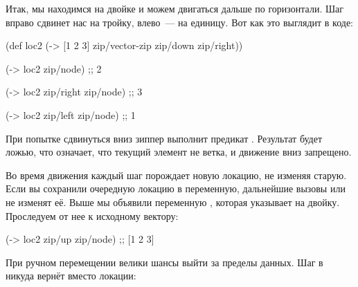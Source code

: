 
Итак, мы находимся на двойке и можем двигаться дальше по горизонтали. Шаг вправо
сдвинет нас на тройку, влево~--- на единицу. Вот как это выглядит в коде:

\begin{english}
  \begin{clojure}
(def loc2
  (-> [1 2 3]
      zip/vector-zip
      zip/down
      zip/right))

(-> loc2 zip/node)
;; 2

(-> loc2 zip/right zip/node)
;; 3

(-> loc2 zip/left zip/node)
;; 1
  \end{clojure}
\end{english}

При попытке сдвинуться вниз зиппер выполнит предикат . Результат
будет ложью, что означает, что текущий элемент не ветка, и движение вниз
запрещено.

Во время движения каждый шаг порождает новую локацию, не изменяя старую. Если вы
сохранили очередную локацию в переменную, дальнейшие вызовы  или
 не изменят её. Выше мы объявили переменную , которая
указывает на двойку. Проследуем от нее к исходному вектору:

\begin{english}
  \begin{clojure}
(-> loc2 zip/up zip/node)
;; [1 2 3]
  \end{clojure}
\end{english}

При ручном перемещении велики шансы выйти за пределы данных. Шаг в никуда вернёт
 вместо локации:



